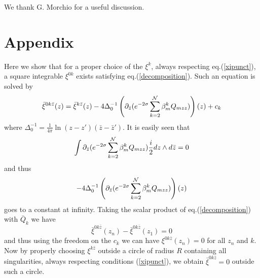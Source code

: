 \documentclass[a4paper,12pt]{article}
\begin{document}
We thank G. Morchio for a useful discussion.


\section*{Appendix}

Here we show that for a proper choice of the $\xi^k$, always
respecting eq.(\ref{xipunct}), a square integrable $\xi^{0k}$
exists satisfying eq.(\ref{decomposition}). Such an equation is solved by 
\begin{equation}
\bar\xi^{0k\bar z } (z) =  \bar\xi^{k\bar z} (z) -4\Delta_0^{-1}
\left( \partial_{\bar z}(e^{-2\sigma} \sum_{k=2}^{\cal N} \beta^k_m
Q_{mzz})\right)(z) +c_k   
\end{equation}  
where $\Delta_0^{-1} = \frac{1}{4\pi}\ln(z-z')(\bar z-\bar z')$.
It is easily seen that 
\begin{equation}
\int \partial_{\bar z}(e^{-2\sigma} \sum_{k=2}^{\cal N} \beta^k_m
Q_{mzz})\frac{i}{2} dz\wedge d\bar z =0
\end{equation}  
and thus
\begin{equation}
-4\Delta_0^{-1}
\left( \partial_{\bar z}(e^{-2\sigma} \sum_{k=2}^{\cal N} \beta^k_m
Q_{mzz})\right)(z)
\end{equation}  
goes to a constant at infinity. Taking the scalar product of
eq.(\ref{decomposition}) with $\bar Q_k$ we have
\begin{equation}
\bar\xi^{0k\bar z } (z_n) -\bar\xi^{0k\bar z } (z_1) =0
\end{equation}  
and thus using the freedom on the $c_k$ we can have $\xi^{0k\bar z}
(z_n)=0$ for all $z_n$ and $k$. Now by properly choosing $\xi^{k\bar
z}$ outside a circle of radius $R$ containing all singularities,
always respecting conditions  
(\ref{xipunct}), we obtain $\bar \xi^{0k\bar z} =0$ outside such a circle.
\end{document}
